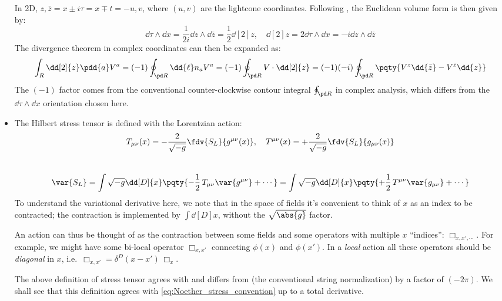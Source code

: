 \documentclass[a4paper
	,10pt
]{article}
\begin{document}
\begin{itemize}
	In 2D, $z,\bar{z} = x \pm i\tau = x \mp t = -u, v$, where $(u,v)$ are the lightcone coordinates. Following \textcite{Polchinski:1998rq}, the Euclidean volume form is then given by:
	\begin{equation}
		\dd{\tau} \wedge \dd{x}
		= \frac{1}{2i} \dd{z} \wedge \dd{\bar{z}}
		= \frac{1}{2} \dd[2]{z},
	\quad
		\dd[2]{z} = 2 \dd{\tau} \wedge \dd{x}
		= -i \dd{z} \wedge \dd{\bar{z}}
	\end{equation}
	The divergence theorem in complex coordinates can then be expanded as:
	\begin{equation}
		\int_R \dd[2]{z} \pdd{a} V^a
		= (-1) \oint_{\pd R}
			\dd{\ell} n_a V^a
		= (-1) \oint_{\pd R}
			V \cdot \dd[2]{z}
		= (-1)(-i) \oint_{\pd R} \pqty{
				V^z \dd{\bar{z}}
				- V^{\bar{z}} \dd{z}
			}
	\end{equation}
	The $(-1)$ factor comes from the conventional counter-clockwise contour integral $\oint_{\pd R}$ in complex \mbox{analysis}, which differs from the $\dd{\tau} \wedge \dd{x}$ orientation chosen here. 
	
	\item The Hilbert stress tensor is defined with the Lorentzian action:
	\begin{equation}
		T_{\mu\nu}(x)
		= - \frac{2}{\sqrt{-g}}
			\fdv{S_L}{g^{\mu\nu}(x)},
	\quad
		T^{\mu\nu}(x)
		= + \frac{2}{\sqrt{-g}}
			\fdv{S_L}{g_{\mu\nu}(x)}
	\end{equation}\\[-1.25\baselineskip]
	\begin{equation}
		\var{S_L}
		= \int \sqrt{-g} \dd[D]{x} 
			\pqty{
				-\frac{1}{2}\, T_{\mu\nu}
				\var{g^{\mu\nu}}
				+ \cdots
			}
		= \int \sqrt{-g} \dd[D]{x} 
			\pqty{
				+\frac{1}{2}\, T^{\mu\nu}
				\var{g_{\mu\nu}}
				+ \cdots
			}
	\end{equation}
	To understand the variational derivative here, we note that in the space of fields it's convenient to think of $x$ as an index to be contracted; the contraction is implemented by $
		\int \dd[D]{x}
	$, without the $\sqrt{\abs{g}}$ factor. 
	
	An action can thus be thought of as the contraction between some fields and some operators with multiple $x$ ``indices'': $\Box_{x,x',\cdots}$. For example, we might have some bi-local operator $\Box_{x,x'}$ connecting $\phi(x)$ and $\phi(x')$. 
	In a \textit{local} action all these operators should be \textit{diagonal} in $x$, i.e.~$
		\Box_{x,x'} = \delta^D(x - x')\,\Box_x
	$. 
	
	The above definition of stress tensor agrees with \cite{Harlow:2019yfa,Compere:2018aar} and differs from \textcite{Polchinski:1998rq} (the conventional string normalization) by a factor of $(-2\pi)$. We shall see that this definition agrees with \eqref{eq:Noether_stress_convention} up to a total derivative. 
	

\end{itemize}
\end{document}
